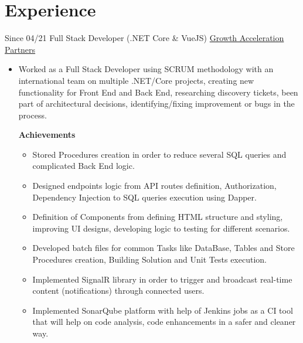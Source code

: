 \documentclass[letterpaper]{twentysecondcv} %
\begin{document}
\section{Experience}
    \begin{twenty}
        \twentyitem
        {Since 04/21}
        {Full Stack Developer (.NET Core \& VueJS)}
        { \href{https://www.growthaccelerationpartners.com/}{Growth Acceleration Partners}}
        {
            \begin{itemize}
                \item Worked as a Full Stack Developer using SCRUM methodology with an international team on multiple .NET/Core projects, creating new functionality for Front End and Back End, researching discovery tickets, been part of architectural decisions, identifying/fixing improvement or bugs in the process.
                
                \textbf{Achievements}
                \begin{itemize}

                    \item Stored Procedures creation in order to reduce several SQL queries and complicated Back End logic. %
                    
                    \item Designed endpoints logic from API routes definition, Authorization, Dependency Injection to SQL queries execution using Dapper.
                    
                    \item Definition of Components from defining HTML structure and styling, improving UI designs, developing logic to testing for different scenarios. %
                    
                    \item Developed batch files for common Tasks like DataBase, Tables and Store Procedures creation, Building Solution and Unit Tests execution.
                    
                    \item Implemented SignalR library in order to trigger and broadcast real-time content (notifications) through connected users. %
                    
                    \item Implemented SonarQube platform with help of Jenkins jobs as a CI tool that will help on code analysis, code enhancements in a safer and cleaner way. %
                    

\end{itemize}
\end{itemize}}
\end{twenty}
\end{document}
